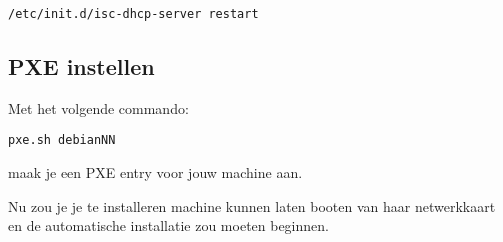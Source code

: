 \documentclass[12pt,a4paper]{article}
\begin{document}
\begin{lstlisting}
/etc/init.d/isc-dhcp-server restart
\end{lstlisting}


\subsection{PXE instellen}
Met het volgende commando:
\begin{lstlisting}
pxe.sh debianNN
\end{lstlisting}
maak je een PXE entry voor jouw machine aan.

Nu zou je je te installeren machine kunnen laten booten van haar netwerkkaart en de automatische installatie zou moeten beginnen.
\end{document}

